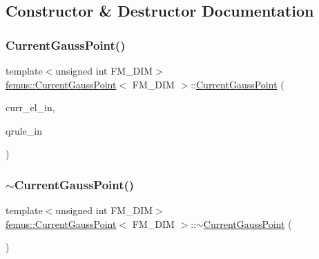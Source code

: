 \subsection{Constructor \& Destructor Documentation}
\mbox{\label{classfemus_1_1_current_gauss_point_ae55cfed8afa742359466fe1f21b10b02}} 
\subsubsection{\texorpdfstring{Current\+Gauss\+Point()}{CurrentGaussPoint()}}
{\footnotesize\ttfamily template$<$unsigned int F\+M\+\_\+\+D\+IM$>$ \\
\mbox{\hyperlink{classfemus_1_1_current_gauss_point}{femus\+::\+Current\+Gauss\+Point}}$<$ F\+M\+\_\+\+D\+IM $>$\+::\mbox{\hyperlink{classfemus_1_1_current_gauss_point}{Current\+Gauss\+Point}} (\begin{DoxyParamCaption}\item[{const \mbox{\hyperlink{classfemus_1_1_current_elem}{Current\+Elem}} \&}]{curr\+\_\+el\+\_\+in,  }\item[{const \mbox{\hyperlink{classfemus_1_1_gauss}{Gauss}} \&}]{qrule\+\_\+in }\end{DoxyParamCaption})}

\mbox{\label{classfemus_1_1_current_gauss_point_a54541c2150b3c273354682ee31e5025d}} 
\subsubsection{\texorpdfstring{$\sim$\+Current\+Gauss\+Point()}{~CurrentGaussPoint()}}
{\footnotesize\ttfamily template$<$unsigned int F\+M\+\_\+\+D\+IM$>$ \\
\mbox{\hyperlink{classfemus_1_1_current_gauss_point}{femus\+::\+Current\+Gauss\+Point}}$<$ F\+M\+\_\+\+D\+IM $>$\+::$\sim$\mbox{\hyperlink{classfemus_1_1_current_gauss_point}{Current\+Gauss\+Point}} (\begin{DoxyParamCaption}{ }\end{DoxyParamCaption})}



